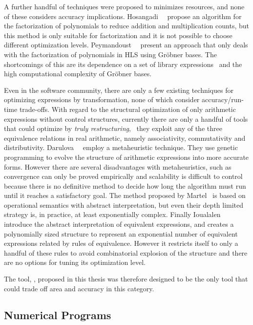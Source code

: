 A further handful of techniques were proposed to minimizes resources, and none
of these considers accuracy implications.  Hosangadi~\etal~\cite{hosangadi}
propose an algorithm for the factorization of polynomials to reduce
addition and multiplication counts, but this method is only suitable for
factorization and it is not possible to choose different optimization
levels. Peymandoust~\etal~\cite{peymandoust} present an approach that
only deals with the factorization of polynomials in HLS using Gr\"obner
bases. The shortcomings of this are its dependence on a set of library
expressions~\cite{hosangadi} and the high computational complexity of Gr\"obner
bases.

Even in the software community, there are only a few existing techniques
for optimizing expressions by transformation, none of which consider
accuracy/run-time trade-offs.  With regard to the structural optimization
of only arithmetic expressions without control structures, currently
there are only a handful of tools that could optimize by \emph{truly
restructuring}, \ie~they exploit any of the three equivalence relations in
real arithmetic, namely associativity, commutativity and distributivity.
Darulova~\etal~\cite{darulova} employ a metaheuristic technique. They use
genetic programming to evolve the structure of arithmetic expressions into more
accurate forms. However there are several disadvantages with metaheuristics,
such as convergence can only be proved empirically and scalability is difficult
to control because there is no definitive method to decide how long the
algorithm must run until it reaches a satisfactory goal. The method proposed
by Martel~\cite{martel07} is based on operational semantics with abstract
interpretation, but even their depth limited strategy is, in practice, at least
exponentially complex.  Finally Ioualalen~\etal~\cite{ioualalen} introduce the
abstract interpretation of equivalent expressions, and creates a polynomially
sized structure to represent an exponential number of equivalent expressions
related by rules of equivalence. However it restricts itself to only a handful
of these rules to avoid combinatorial explosion of the structure and there are
no options for tuning its optimization level.

The tool, \soap{}, proposed in this thesis was therefore designed to be the
only tool that could trade off area and accuracy in this category.


\subsection{Numerical Programs}
\label{bg:sub:numerical_programs}

